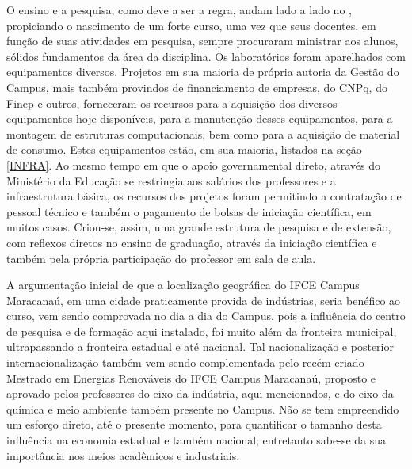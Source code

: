 \documentclass{paper}
\begin{document}
O ensino e a pesquisa, como deve a ser a regra, andam lado a lado no \NOMECURSO, propiciando o nascimento de um forte curso, uma vez que seus docentes, em função de suas atividades em pesquisa, sempre procuraram ministrar aos alunos, sólidos fundamentos da área da disciplina. Os laboratórios foram aparelhados com equipamentos diversos. Projetos em sua maioria de própria autoria da Gestão do Campus, mais também provindos de financiamento de empresas, do CNPq, do Finep e outros, forneceram os recursos para a aquisição dos diversos equipamentos hoje disponíveis, para a manutenção desses equipamentos, para a montagem de estruturas computacionais, bem como para a aquisição de material de consumo. Estes equipamentos estão, em sua maioria, listados na seção \ref{INFRA}. Ao mesmo tempo em que o apoio governamental direto, através do Ministério da Educação se restringia aos salários dos professores e a infraestrutura básica, os recursos dos projetos foram permitindo a contratação de pessoal técnico e também o pagamento de bolsas de iniciação científica, em muitos casos. Criou-se, assim, uma grande estrutura de pesquisa e de extensão, com reflexos diretos no ensino de graduação, através da iniciação científica e também pela própria participação do professor em sala de aula. 

A argumentação inicial de que a localização geográfica do IFCE Campus Maracanaú, em uma cidade praticamente provida de indústrias, seria benéfico ao curso, vem sendo comprovada no dia a dia do Campus, pois a influência do centro de pesquisa e de formação aqui instalado, foi muito além da fronteira municipal, ultrapassando a fronteira estadual e até nacional. Tal nacionalização e posterior internacionalização também vem sendo complementada pelo recém-criado Mestrado em Energias Renováveis do IFCE Campus Maracanaú, proposto e aprovado pelos professores do eixo da indústria, aqui mencionados, e do eixo da química e meio ambiente também presente no Campus. Não se tem empreendido um esforço direto, até o presente momento, para quantificar o tamanho desta influência na economia estadual e também nacional; entretanto sabe-se da sua importância nos meios acadêmicos e industriais. 
\end{document}
